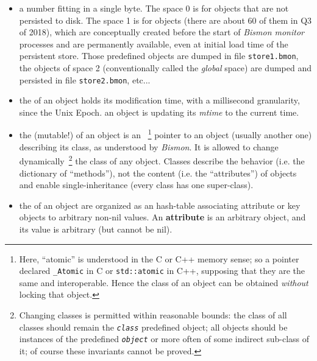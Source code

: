 \begin{itemize}
  \item a  number fitting in a single
    byte. The space 0 is for 
    objects that are not persisted to disk. The space 1 is for
     objects (there are about 60
    of them in Q3 of 2018), which are conceptually created before the
    start of \emph{Bismon monitor} processes and are permanently
    available, even at initial load time of the persistent
    store. Those predefined objects are dumped in file
    \texttt{store1.bmon}, the objects of space 2 (conventionally
    called the \emph{global} space) are dumped and persisted in file
    \texttt{store2.bmon}, etc...

    \item the  of an object holds its
      modification time, with a millisecond granularity, since the
      Unix Epoch.  an object is updating its
      \emph{mtime} to the current time.

    \item the (mutable!)  of an object is
      an ~\footnote{Here, ``atomic'' is
        understood in the C or C++ memory sense; so a pointer declared
        \texttt{\_Atomic} in C or \texttt{std::atomic} in C++,
        supposing that they are the same and interoperable. Hence the
        class of an object can be obtained \emph{without} locking that
        object.} pointer to an object (usually another one) describing
      its class, as understood by \emph{Bismon}. It is allowed to
      change dynamically~\footnote{Changing classes is permitted
        within reasonable bounds: the class of all classes should
        remain the \emph{\texttt{class}} predefined object; all
        objects should be instances of the predefined
        \emph{\texttt{object}} or more often of some indirect
        sub-class of it; of course these invariants cannot be proved.}
      the class of any object. Classes describe the behavior (i.e. the
      dictionary of ``methods''), not the content (i.e. the
      ``attributes'') of objects and enable single-inheritance (every
      class has one super-class).

    \item the  of an object are
      organized as an hash-table associating attribute or key objects
      to arbitrary non-nil values. An \textbf{attribute} is an
      arbitrary object, and its value is arbitrary (but cannot be
      nil).


\end{itemize}
